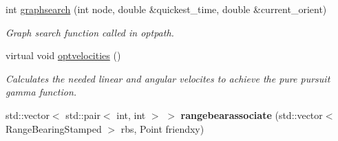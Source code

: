 \begin{DoxyCompactItemize}
int \hyperlink{classControl_a3b1ef3f00ba7fdee871d352d7d5f546e}{graphsearch} (int node, double \&quickest\+\_\+time, double \&current\+\_\+orient)
\begin{DoxyCompactList}\small\item\em Graph search function called in optpath. \end{DoxyCompactList}\item 
\mbox{\label{classControl_a1282c47a9b0a0b6b9d5c19dd4cfa2764}} 
virtual void \hyperlink{classControl_a1282c47a9b0a0b6b9d5c19dd4cfa2764}{optvelocities} ()
\begin{DoxyCompactList}\small\item\em Calculates the needed linear and angular velocites to achieve the pure pursuit gamma function. \end{DoxyCompactList}\item 
\mbox{\label{classControl_abdb51463e49b88bde90c97c2c72d3148}} 
std\+::vector$<$ std\+::pair$<$ int, int $>$ $>$ {\bfseries rangebearassociate} (std\+::vector$<$ Range\+Bearing\+Stamped $>$ rbs, Point friendxy)
\end{DoxyCompactItemize}

